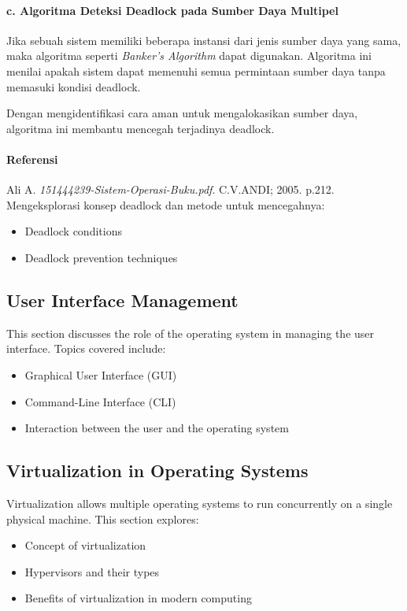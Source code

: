 \documentclass[12pt]{article}
\begin{document}
\paragraph{c. Algoritma Deteksi Deadlock pada Sumber Daya Multipel}

Jika sebuah sistem memiliki beberapa instansi dari jenis sumber daya yang sama, maka algoritma seperti \textit{Banker's Algorithm} dapat digunakan. Algoritma ini menilai apakah sistem dapat memenuhi semua permintaan sumber daya tanpa memasuki kondisi deadlock.

Dengan mengidentifikasi cara aman untuk mengalokasikan sumber daya, algoritma ini membantu mencegah terjadinya deadlock.

\paragraph{Referensi}
Ali A. \textit{151444239-Sistem-Operasi-Buku.pdf}. C.V.ANDI; 2005. p.212.
Mengeksplorasi konsep deadlock dan metode untuk mencegahnya:
\begin{itemize}
    \item Deadlock conditions
    \item Deadlock prevention techniques
\end{itemize}

\subsection{User Interface Management}
This section discusses the role of the operating system in managing the user interface. Topics covered include:
\begin{itemize}
    \item Graphical User Interface (GUI)
    \item Command-Line Interface (CLI)
    \item Interaction between the user and the operating system
\end{itemize}

\subsection{Virtualization in Operating Systems}
Virtualization allows multiple operating systems to run concurrently on a single physical machine. This section explores:
\begin{itemize}
    \item Concept of virtualization
    \item Hypervisors and their types
    \item Benefits of virtualization in modern computing
\end{itemize}
\end{document}
